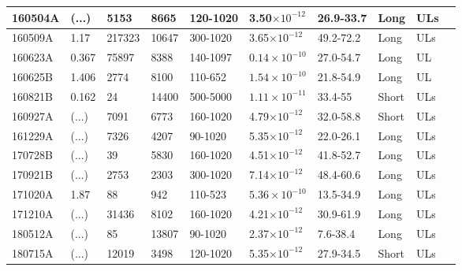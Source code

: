 \begin{longtable}{llllllllll}
                \midrule
160504A & (...)  & 5153 & 8665 & 120-1020 &  3.50$\times10^{-12}$   & 26.9-33.7 & Long & ULs & \cite{2025AeA...700A..96A}  \\
                \midrule
160509A & 1.17 & 217323 &  10647  &  300-1020& 3.65$\times10^{-12}$  & 49.2-72.2 & Long & ULs & \cite{2025AeA...700A..96A}  \\
                \midrule
160623A & 0.367 & 75897 &  8388  & 140-1097 & $0.14 \times10^{-10}$  & 27.0-54.7 & Long & UL & \cite{2025AeA...700A..96A}  \\
                \midrule
160625B & 1.406 & 2774 & 8100 & 110-652 & $1.54\times10^{-10}$  & 21.8-54.9 & Long & UL & \cite{2025AeA...700A..96A}  \\
               \midrule
160821B & 0.162 & 24 & 14400 & 500-5000 & $1.11\times10^{-11}$ & 33.4-55 & Short & ULs & \cite{2021ApJ...908...90A} \\
                \midrule
160927A & (...)  & 7091 & 6773 & 160-1020 &  4.79$\times10^{-12}$  & 32.0-58.8 & Short & ULs & \cite{2025AeA...700A..96A}  \\
                \midrule
161229A & (...)  & 7326 & 4207 & 90-1020 & 5.35$\times10^{-12}$   & 22.0-26.1 & Long & ULs & \cite{2025AeA...700A..96A}  \\
                \midrule
170728B & (...)  & 39 & 5830 & 160-1020 &  4.51$\times10^{-12}$  & 41.8-52.7 & Long & ULs & \cite{2025AeA...700A..96A}  \\
                \midrule
170921B & (...)  & 2753 & 2303 & 300-1020 & 7.14$\times10^{-12}$  & 48.4-60.6 & Long & ULs & \cite{2025AeA...700A..96A}  \\
                \midrule
171020A & 1.87 & 88 & 942 & 110-523  & $5.36\times10^{-10}$  & 13.5-34.9 & Long & ULs & \cite{2025AeA...700A..96A}  \\
                \midrule
171210A & (...)  & 31436 & 8102 & 160-1020   & 4.21$\times10^{-12}$  & 30.9-61.9 & Long & ULs & \cite{2025AeA...700A..96A}  \\
                \midrule
180512A & (...)  & 85 & 13807 & 90-1020 &  2.37$\times10^{-12}$ & 7.6-38.4 & Long & ULs & \cite{2025AeA...700A..96A}  \\
                \midrule
180715A & (...)  & 12019 &  3498& 120-1020  & 5.35$\times10^{-12}$  & 27.9-34.5 & Short & ULs & \cite{2025AeA...700A..96A}  \\

\end{longtable}
